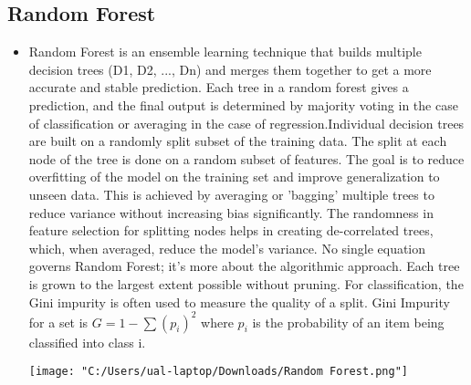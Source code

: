 \documentclass[12pt]{article}
\begin{document}
\subsection*{Random Forest}
\begin{itemize}
    \item Random Forest is an ensemble learning technique that builds multiple decision trees (D1, D2, ..., Dn) and merges them together to get a more accurate and stable prediction. Each tree in a random forest gives a prediction, and the final output is determined by majority voting in the case of classification or averaging in the case of regression.Individual decision trees are built on a randomly split subset of the training data. The split at each node of the tree is done on a random subset of features. The goal is to reduce overfitting of the model on the training set and improve generalization to unseen data. This is achieved by averaging or 'bagging' multiple trees to reduce variance without increasing bias significantly. The randomness in feature selection for splitting nodes helps in creating de-correlated trees, which, when averaged, reduce the model's variance. No single equation governs Random Forest; it's more about the algorithmic approach. Each tree is grown to the largest extent possible without pruning. For classification, the Gini impurity is often used to measure the quality of a split. Gini Impurity for a set is \( G = 1 - \sum (p_i)^2 \) where \( p_i \) is the probability of an item being classified into class i.
    \begin{center}
        \texttt{[image: "C:/Users/ual-laptop/Downloads/Random Forest.png"]} 
    \end{center}
\end{itemize}
\end{document}
